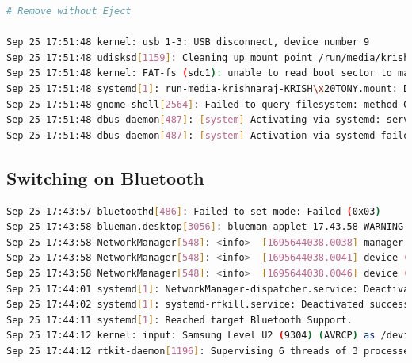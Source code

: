 \documentclass[11pt]{article}
\begin{document}
\begin{lstlisting}[language=bash]
# Remove without Eject

Sep 25 17:51:48 kernel: usb 1-3: USB disconnect, device number 9
Sep 25 17:51:48 udisksd[1159]: Cleaning up mount point /run/media/krishnaraj/KRISH TONY (device 8:33 no longer exists)
Sep 25 17:51:48 kernel: FAT-fs (sdc1): unable to read boot sector to mark fs as dirty
Sep 25 17:51:48 systemd[1]: run-media-krishnaraj-KRISH\x20TONY.mount: Deactivated successfully.
Sep 25 17:51:48 gnome-shell[2564]: Failed to query filesystem: method Gio.File.query_filesystem_info_async: At least 4 arguments required, but only 3 passed
Sep 25 17:51:48 dbus-daemon[487]: [system] Activating via systemd: service name='org.freedesktop.Avahi' unit='dbus-org.freedesktop.Avahi.service' requested by ':1.304' (uid=969 pid=104916 comm="/usr/lib/colord-sane")
Sep 25 17:51:48 dbus-daemon[487]: [system] Activation via systemd failed for unit 'dbus-org.freedesktop.Avahi.service': Unit dbus-org.freedesktop.Avahi.service not found.

\end{lstlisting}
\subsection{Switching on Bluetooth}

\begin{lstlisting}[language=bash]
Sep 25 17:43:57 bluetoothd[486]: Failed to set mode: Failed (0x03)
Sep 25 17:43:58 blueman.desktop[3056]: blueman-applet 17.43.58 WARNING  PowerManager:203 on_adapter_property_changed: adapter powered on while in off state, turning bluetooth on
Sep 25 17:43:58 NetworkManager[548]: <info>  [1695644038.0038] manager: (04:C8:07:31:0F:FB): new Bluetooth device (/org/freedesktop/NetworkManager/Devices/12)
Sep 25 17:43:58 NetworkManager[548]: <info>  [1695644038.0041] device (04:C8:07:31:0F:FB): state change: unmanaged -> unavailable (reason 'managed', sys-iface-state: 'external')
Sep 25 17:43:58 NetworkManager[548]: <info>  [1695644038.0046] device (04:C8:07:31:0F:FB): state change: unavailable -> disconnected (reason 'none', sys-iface-state: 'managed')
Sep 25 17:44:01 systemd[1]: NetworkManager-dispatcher.service: Deactivated successfully.
Sep 25 17:44:02 systemd[1]: systemd-rfkill.service: Deactivated successfully.
Sep 25 17:44:11 systemd[1]: Reached target Bluetooth Support.
Sep 25 17:44:12 kernel: input: Samsung Level U2 (9304) (AVRCP) as /devices/virtual/input/input44
Sep 25 17:44:12 rtkit-daemon[1196]: Supervising 6 threads of 3 processes of 1 users
\end{lstlisting}
\end{document}
